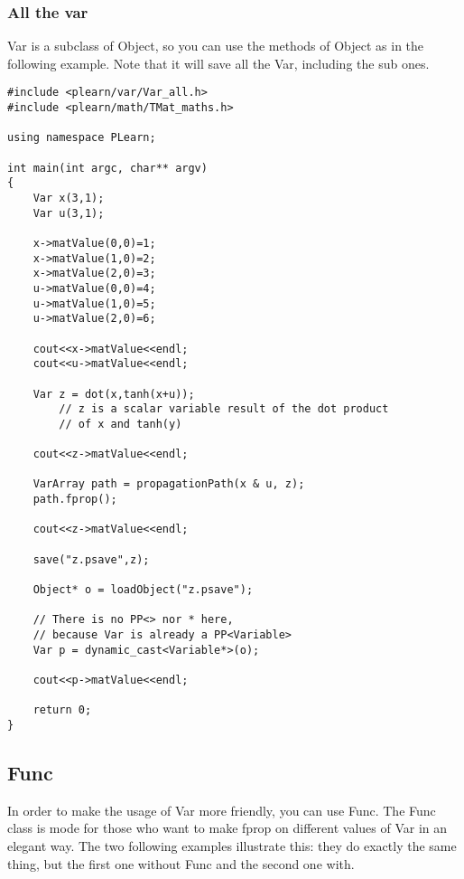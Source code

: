 \documentclass[11pt]{book}
\begin{document}
\subsubsection{All the var}

Var is a subclass of Object, so you can use the methods of Object
as in the following example. Note that it will save all the Var,
including the sub ones.

\begin{verbatim}
#include <plearn/var/Var_all.h>
#include <plearn/math/TMat_maths.h>

using namespace PLearn;

int main(int argc, char** argv)
{
    Var x(3,1);
    Var u(3,1);

    x->matValue(0,0)=1;
    x->matValue(1,0)=2;
    x->matValue(2,0)=3;
    u->matValue(0,0)=4;
    u->matValue(1,0)=5;
    u->matValue(2,0)=6;

    cout<<x->matValue<<endl;
    cout<<u->matValue<<endl;

    Var z = dot(x,tanh(x+u));
        // z is a scalar variable result of the dot product
        // of x and tanh(y)

    cout<<z->matValue<<endl;

    VarArray path = propagationPath(x & u, z);
    path.fprop();

    cout<<z->matValue<<endl;

    save("z.psave",z);

    Object* o = loadObject("z.psave");

    // There is no PP<> nor * here,
    // because Var is already a PP<Variable>
    Var p = dynamic_cast<Variable*>(o);

    cout<<p->matValue<<endl;

    return 0;
}
\end{verbatim}


\subsection{Func}

In order to make the usage of Var more friendly, you can use Func. The
Func class is mode for those who want to make fprop on different values
of Var in an elegant way. The two following examples illustrate this:
they do exactly the same thing, but the first one without Func and the
second one with.
\end{document}
